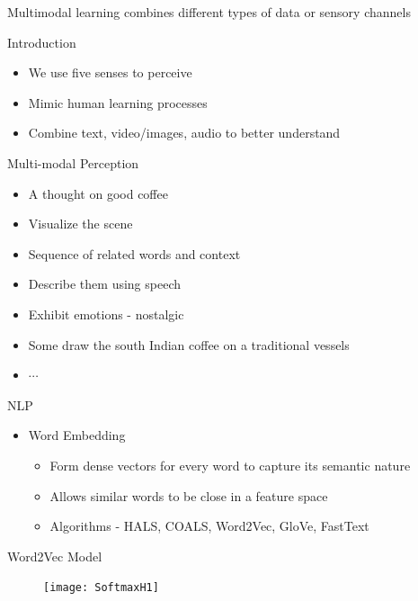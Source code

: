 \begin{frame}

\Large Multimodal learning combines different types of data or sensory channels
\end{frame}


\begin{frame}{Introduction}
    \begin{itemize}

    \item We use five senses to perceive
    \item Mimic human learning processes
    \item Combine text, video/images, audio to better understand
    \end{itemize}

\end{frame}

\begin{frame}{Multi-modal Perception}
    \begin{itemize}
        \item A thought on good coffee
        \item Visualize the scene
        \item Sequence of related words and context
        \item Describe them using speech
        \item Exhibit emotions - nostalgic
        \item Some draw the south Indian coffee on a traditional vessels
        \item \(\cdots\)
   \end{itemize}
\end{frame}

\begin{frame}{NLP}
\begin{itemize}
    \item 	[] Word Embedding
    \begin{itemize}
        \item Form dense vectors for every word to capture its semantic nature
        \item Allows similar words to be close in a feature space
        \item Algorithms - HALS, COALS, Word2Vec, GloVe, FastText
    \end{itemize}
\end{itemize}
\end{frame}

\begin{frame}{Word2Vec Model}
\begin{figure}
	\centering
	\texttt{[image: SoftmaxH1]}
\end{figure}
\end{frame}

